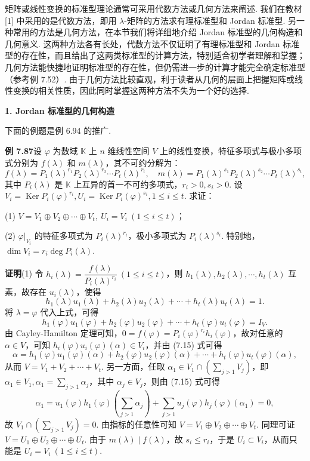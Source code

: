 \documentclass[UTF8,12pt,a4paper,fontset=fandol]{ctexart}
\begin{document}
矩阵或线性变换的标准型理论通常可采用代数方法或几何方法来阐述. 我们在教材 [1] 中采用的是代数方法，即用 $\lambda$-矩阵的方法求有理标准型和 Jordan 标准型. 另一种常用的方法是几何方法，在本节我们将详细地介绍 Jordan 标准型的几何构造和几何意义. 这两种方法各有长处，代数方法不仅证明了有理标准型和 Jordan 标准型的存在性，而且给出了这两类标准型的计算方法，特别适合初学者理解和掌握；几何方法能快捷地证明标准型的存在性，但仍需进一步的计算才能完全确定标准型（参考例 7.52）. 由于几何方法比较直观，利于读者从几何的层面上把握矩阵或线性变换的相关性质，因此同时掌握这两种方法不失为一个好的选择.

\noindent\textbf{1. Jordan 标准型的几何构造}

下面的例题是例 6.94 的推广.

\noindent\textbf{例 7.87}\quad 设 $\varphi$ 为数域 $\mathbb{K}$ 上 $n$ 维线性空间 $V$ 上的线性变换，特征多项式与极小多项式分别为 $f(\lambda)$ 和 $m(\lambda)$，其不可约分解为：
\[
f(\lambda)=P_1(\lambda)^{r_1}P_2(\lambda)^{r_2}\cdots P_t(\lambda)^{r_t},\quad
m(\lambda)=P_1(\lambda)^{s_1}P_2(\lambda)^{s_2}\cdots P_t(\lambda)^{s_t},
\]
其中 $P_i(\lambda)$ 是 $\mathbb{K}$ 上互异的首一不可约多项式，$r_i>0,s_i>0$. 设 $V_i=\operatorname{Ker}P_i(\varphi)^{r_i},U_i=\operatorname{Ker}P_i(\varphi)^{s_i},1\le i\le t$. 求证：

(1) $V=V_1\oplus V_2\oplus\cdots\oplus V_t,\ U_i=V_i\ (1\le i\le t)$；

(2) $\varphi|_{V_i}$ 的特征多项式为 $P_i(\lambda)^{r_i}$，极小多项式为 $P_i(\lambda)^{s_i}$. 特别地，$\dim V_i=r_i\deg P_i(\lambda)$.

\noindent\textbf{证明}\quad (1) 令 $h_i(\lambda)=\dfrac{f(\lambda)}{P_i(\lambda)^{r_i}}\ (1\le i\le t)$，则 $h_1(\lambda),h_2(\lambda),\cdots,h_t(\lambda)$ 互素，故存在 $u_i(\lambda)$，使得
\[
h_1(\lambda)u_1(\lambda)+h_2(\lambda)u_2(\lambda)+\cdots+h_t(\lambda)u_t(\lambda)=1.
\]
将 $\lambda=\varphi$ 代入上式，可得
\begin{equation}
h_1(\varphi)u_1(\varphi)+h_2(\varphi)u_2(\varphi)+\cdots+h_t(\varphi)u_t(\varphi)=I_V.
\tag{7.15}
\end{equation}
由 Cayley-Hamilton 定理可知，$0=f(\varphi)=P_i(\varphi)^{r_i}h_i(\varphi)$，故对任意的 $\alpha\in V$，可知 $h_i(\varphi)u_i(\varphi)(\alpha)\in V_i$，并由 (7.15) 式可得
\[
\alpha=h_1(\varphi)u_1(\varphi)(\alpha)+h_2(\varphi)u_2(\varphi)(\alpha)+\cdots+h_t(\varphi)u_t(\varphi)(\alpha),
\]
从而 $V=V_1+V_2+\cdots+V_t$. 另一方面，任取 $\alpha_1\in V_1\cap(\sum_{j>1}V_j)$，即 $\alpha_1\in V_1,\alpha_1=\sum_{j>1}\alpha_j$，其中 $\alpha_j\in V_j$，则由 (7.15) 式可得
\[
\alpha_1=u_1(\varphi)h_1(\varphi)\left(\sum_{j>1}\alpha_j\right)+\sum_{j>1}u_j(\varphi)h_j(\varphi)(\alpha_1)=0,
\]
故 $V_1\cap(\sum_{j>1}V_j)=0$. 由指标的任意性可知 $V=V_1\oplus V_2\oplus\cdots\oplus V_t$. 同理可证 $V=U_1\oplus U_2\oplus\cdots\oplus U_t$. 由于 $m(\lambda)\mid f(\lambda)$，故 $s_i\le r_i$，于是 $U_i\subset V_i$，从而只能是 $U_i=V_i\ (1\le i\le t)$.
\end{document}
